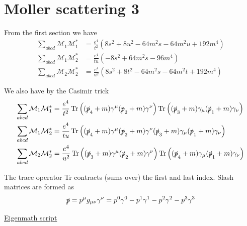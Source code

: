

\section*{Moller scattering 3}

From the first section we have
\begin{align*}
\sum_{abcd}\mathcal M_1\mathcal M_1^*&=\frac{e^4}{t^2}
\left(8 s^2 + 8 u^2 - 64 m^2 s - 64 m^2 u + 192 m^4\right)
\\
\sum_{abcd}\mathcal M_1\mathcal M_2^*&=\frac{e^4}{tu}
\left(-8 s^2 + 64 m^2 s - 96 m^4\right)
\\
\sum_{abcd}\mathcal M_2\mathcal M_2^*&=\frac{e^4}{u^2}
\left(8 s^2 + 8 t^2 - 64 m^2 s - 64 m^2 t + 192 m^4\right)
\end{align*}

We also have by the Casimir trick
\begin{align*}
\sum_{abcd}\mathcal M_1\mathcal M_1^*&=\frac{e^4}{t^2}
\operatorname{Tr}\left(
(\slashed p_4+m)\gamma^\mu(\slashed p_2+m)\gamma^\nu
\right)
\operatorname{Tr}\left(
(\slashed p_3+m)\gamma_\mu(\slashed p_1+m)\gamma_\nu
\right)
\\
\sum_{abcd}\mathcal M_1\mathcal M_2^*&=\frac{e^4}{tu}
\operatorname{Tr}\left(
(\slashed p_4+m)\gamma^\mu(\slashed p_2+m)\gamma^\nu
(\slashed p_3+m)\gamma_\mu(\slashed p_1+m)\gamma_\nu
\right)
\\
\sum_{abcd}\mathcal M_2\mathcal M_2^*&=\frac{e^4}{u^2}
\operatorname{Tr}\left(
(\slashed p_3+m)\gamma^\mu(\slashed p_2+m)\gamma^\nu
\right)
\operatorname{Tr}\left(
(\slashed p_4+m)\gamma_\mu(\slashed p_1+m)\gamma_\nu
\right)
\end{align*}

The trace operator Tr contracts (sums over) the first and last index.
Slash matrices are formed as
\begin{equation*}
\slashed p=p^\mu g_{\mu\nu}\gamma^\nu
=p^0\gamma^0-p^1\gamma^1-p^2\gamma^2-p^3\gamma^3
\end{equation*}

\href{https://georgeweigt.github.io/examples/moller-scattering-3-demo.html}{Eigenmath script}



